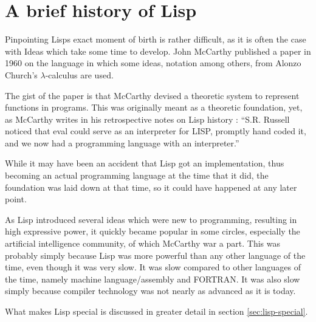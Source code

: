 \documentclass[a4paper,10pt,twoside]{article}
\begin{document}
\section{A brief history of Lisp}
\label{sec:lisp-hist}

Pinpointing Lisps exact moment of birth is rather difficult, as it is often the
case with Ideas which take some time to develop.  John McCarthy published a
paper in 1960 on the language\cite{rec-fun-sym-expr} in which some ideas,
notation among others, from Alonzo Church’s $\lambda$-calculus are used.

The gist of the paper is that McCarthy devised a theoretic system to represent
functions in programs.  This was originally meant as a theoretic foundation,
yet, as McCarthy writes in his retrospective notes on Lisp history
\cite{lisp-hist}: “S.R. Russell noticed that eval could serve as an interpreter
for LISP, promptly hand coded it, and we now had a programming language with an
interpreter.”

While it may have been an accident that Lisp got an implementation, thus
becoming an actual programming language at the time that it did, the foundation
was laid down at that time, so it could have happened at any later point.

As Lisp introduced several ideas which were new to programming, resulting in
high expressive power, it quickly became popular in some circles, especially the
artificial intelligence community, of which McCarthy war a part.  This was
probably simply because Lisp was more powerful than any other language of the
time, even though it was very slow.  It was slow compared to other languages of
the time, namely machine language/assembly and FORTRAN.  It was also slow simply
because compiler technology was not nearly as advanced as it is today.

What makes Lisp special is discussed in greater detail in section
\ref{sec:lisp-special}. 
\end{document}
